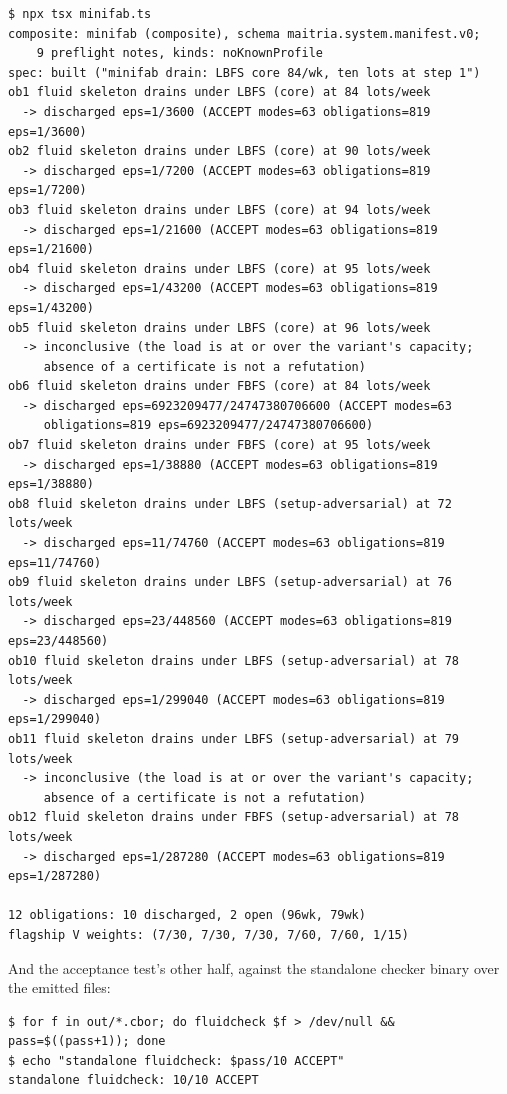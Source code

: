 \begin{Verbatim}[fontsize=\small,frame=leftline,rulecolor=\color{accentmid},framesep=3mm,xleftmargin=3mm]
$ npx tsx minifab.ts
composite: minifab (composite), schema maitria.system.manifest.v0;
    9 preflight notes, kinds: noKnownProfile
spec: built ("minifab drain: LBFS core 84/wk, ten lots at step 1")
ob1 fluid skeleton drains under LBFS (core) at 84 lots/week
  -> discharged eps=1/3600 (ACCEPT modes=63 obligations=819 eps=1/3600)
ob2 fluid skeleton drains under LBFS (core) at 90 lots/week
  -> discharged eps=1/7200 (ACCEPT modes=63 obligations=819 eps=1/7200)
ob3 fluid skeleton drains under LBFS (core) at 94 lots/week
  -> discharged eps=1/21600 (ACCEPT modes=63 obligations=819 eps=1/21600)
ob4 fluid skeleton drains under LBFS (core) at 95 lots/week
  -> discharged eps=1/43200 (ACCEPT modes=63 obligations=819 eps=1/43200)
ob5 fluid skeleton drains under LBFS (core) at 96 lots/week
  -> inconclusive (the load is at or over the variant's capacity;
     absence of a certificate is not a refutation)
ob6 fluid skeleton drains under FBFS (core) at 84 lots/week
  -> discharged eps=6923209477/24747380706600 (ACCEPT modes=63
     obligations=819 eps=6923209477/24747380706600)
ob7 fluid skeleton drains under FBFS (core) at 95 lots/week
  -> discharged eps=1/38880 (ACCEPT modes=63 obligations=819 eps=1/38880)
ob8 fluid skeleton drains under LBFS (setup-adversarial) at 72 lots/week
  -> discharged eps=11/74760 (ACCEPT modes=63 obligations=819 eps=11/74760)
ob9 fluid skeleton drains under LBFS (setup-adversarial) at 76 lots/week
  -> discharged eps=23/448560 (ACCEPT modes=63 obligations=819 eps=23/448560)
ob10 fluid skeleton drains under LBFS (setup-adversarial) at 78 lots/week
  -> discharged eps=1/299040 (ACCEPT modes=63 obligations=819 eps=1/299040)
ob11 fluid skeleton drains under LBFS (setup-adversarial) at 79 lots/week
  -> inconclusive (the load is at or over the variant's capacity;
     absence of a certificate is not a refutation)
ob12 fluid skeleton drains under FBFS (setup-adversarial) at 78 lots/week
  -> discharged eps=1/287280 (ACCEPT modes=63 obligations=819 eps=1/287280)

12 obligations: 10 discharged, 2 open (96wk, 79wk)
flagship V weights: (7/30, 7/30, 7/30, 7/60, 7/60, 1/15)
\end{Verbatim}

\noindent And the acceptance test's other half, against the
standalone checker binary over the emitted files:

\begin{Verbatim}[fontsize=\small,frame=leftline,rulecolor=\color{accentmid},framesep=3mm,xleftmargin=3mm]
$ for f in out/*.cbor; do fluidcheck $f > /dev/null && pass=$((pass+1)); done
$ echo "standalone fluidcheck: $pass/10 ACCEPT"
standalone fluidcheck: 10/10 ACCEPT
\end{Verbatim}

